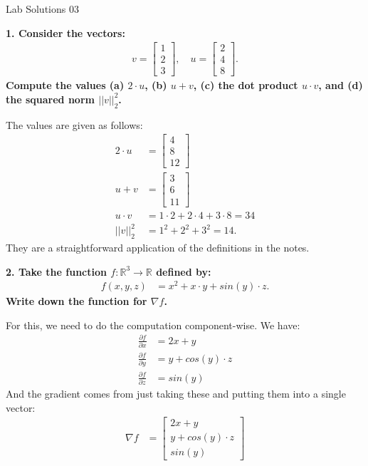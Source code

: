 \documentclass[12pt,hidelinks]{article}
\numberwithin{equation}{section}
\begin{document}
{\LARGE Lab Solutions 03}

\vspace*{12pt}

\textbf{1. Consider the vectors:}
\begin{align}
v = \begin{bmatrix} 1 \\ 2 \\ 3 \end{bmatrix}, \quad
u = \begin{bmatrix} 2 \\ 4 \\ 8 \end{bmatrix}.
\end{align}
\textbf{Compute the values (a) $2 \cdot u$, (b) $u + v$, (c) the dot product $u \cdot v$,
and (d) the squared norm $|| v ||_2^2$.}

\vspace*{12pt}

The values are given as follows:
\begin{align}
2 \cdot u &= \begin{bmatrix} 4 \\ 8 \\ 12 \end{bmatrix} \\
u + v &= \begin{bmatrix} 3 \\ 6 \\ 11 \end{bmatrix} \\
u \cdot v &= 1 \cdot 2 + 2 \cdot 4 + 3 \cdot 8 = 34 \\
|| v ||_2^2 &= 1^2 + 2^2 + 3^2 = 14.
\end{align}
They are a straightforward application of the definitions in the notes.

\vspace*{12pt}

\textbf{2. Take the function $f: \mathbb{R}^3 \rightarrow \mathbb{R}$ defined by:}
\begin{align}
f(x, y, z) &= x^2 + x \cdot y + sin(y) \cdot z.
\end{align}
\textbf{Write down the function for $\nabla f$.}

\vspace*{12pt}

For this, we need to do the computation component-wise. We have:
\begin{align}
\frac{\partial f}{\partial x} &= 2x + y \\
\frac{\partial f}{\partial y} &= y + cos(y) \cdot z \\
\frac{\partial f}{\partial z} &= sin(y)
\end{align}
And the gradient comes from just taking these and putting them into a single
vector:
\begin{align}
\nabla f &= \begin{bmatrix} 2x + y \\ y + cos(y) \cdot z \\ sin(y) \end{bmatrix}
\end{align}
\end{document}
